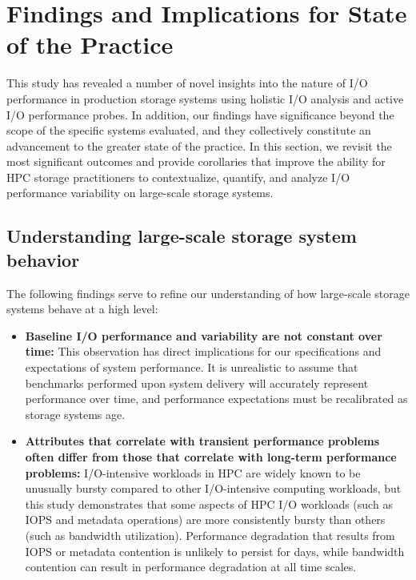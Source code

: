 \section{Findings and Implications for State of the Practice}
\label{sec:findings}


This study has revealed a number of novel insights into the nature of I/O performance in production storage systems using holistic I/O analysis and active I/O performance probes.
In addition, our findings have significance beyond the scope of the specific systems evaluated, and they collectively constitute an advancement to the greater state of the practice.
In this section, we revisit the most significant outcomes and provide corollaries that improve the ability for HPC storage practitioners to contextualize, quantify, and analyze I/O performance variability on large-scale storage systems.

\subsection{Understanding large-scale storage system behavior}

The following findings serve to refine our understanding of how large-scale storage
systems behave at a high level: 

\begin{itemize}[leftmargin=*]

\item \textbf{Baseline I/O performance and variability are not constant over
time:}
This observation has direct implications for our specifications and expectations of system performance.
It is unrealistic to assume that benchmarks performed upon system delivery will accurately represent performance over time, and performance expectations must be recalibrated as storage systems age.

\item \textbf{Attributes that correlate with transient performance problems often differ from those that correlate with long-term performance problems:}
I/O-intensive workloads in HPC are widely known to be unusually bursty compared to other I/O-intensive computing workloads, but this study demonstrates that some aspects of HPC I/O workloads (such as IOPS and metadata operations) are more consistently bursty than others (such as bandwidth utilization).
Performance degradation that results from IOPS or metadata contention is unlikely to persist for days, while bandwidth contention can result in performance degradation at all time scales.

\end{itemize}


